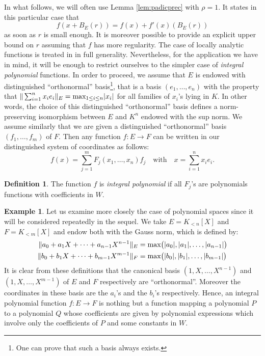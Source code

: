 \documentclass{jT}
\numberwithin{equation}{section}
\theoremstyle{definition}
\newtheorem{ex}[theo]{Example}
\newtheorem{deftn}[theo]{Definition}
\renewcommand{\max}{\text{\rm max}}
\newcommand{\A}{W}
\begin{document}
In what follows, we will often use Lemma \ref{lem:padicprec} with
$\rho = 1$. It states in this particular case that 
\begin{equation}
\label{eq:padicprec2}
f(x + B_E(r)) = f(x) + f'(x)(B_E(r))
\end{equation}
as soon as $r$ is small enough. It is moreover possible to provide
an explicit upper bound on $r$ assuming that $f$ has more regularity.
The case of locally analytic functions is treated in \cite{padicprec}
in full generality. Nevertheless, for the application we have in mind, 
it will be enough to restrict ourselves to the simpler case of 
\emph{integral polynomial} functions. In order to proceed, we assume 
that $E$ is endowed with distinguished ``orthonormal'' 
basis\footnote{One can prove that such a basis always exists.}, that is 
a basis $(e_1, \ldots, e_n)$ with the property that $\Vert \sum_{i=1}^n 
x_i e_i \Vert_E = \max_{1\leq i \leq n} |x_i|$ for all 
families of $x_i$'s lying in $K$. In other words, the choice of
this distinguished ``orthonormal'' basis defines a norm-preserving 
isomorphism between $E$ and $K^n$ endowed with the sup norm. We assume
similarly that we are given a distinguished ``orthonormal'' basis
$(f_1, \ldots, f_m)$ of $F$. Then any function $f : E \to F$ can
be written in our distinguished system of coordinates as follows:
$$f(x) = \sum_{j=1}^m F_j(x_1, \ldots, x_n) f_j
\quad \text{with} \quad x = \sum_{i=1}^n x_i e_i.$$

\begin{deftn}
The function $f$ is \emph{integral polynomial} if all $F_j$'s are
polynomials functions with coefficients in $\A$.
\end{deftn}

\begin{ex}
\label{ex:Gaussnorm}
Let us examine more closely the case of polynomial spaces since it will 
be considered repeatedly in the sequel. We take $E = K_{<n}[X]$ and $F = 
K_{<m}[X]$ and endow both with the Gauss norm, which is defined by:
\begin{align*}
\Vert a_0 + a_1 X + \cdots + a_{n-1} X^{n-1} \Vert_E & 
  = \max \big(|a_0|, |a_1|, \ldots, |a_{n-1}|\big) \\
\Vert b_0 + b_1 X + \cdots + b_{m-1} X^{m-1} \Vert_F & 
  = \max \big(|b_0|, |b_1|, \ldots, |b_{m-1}|\big)
\end{align*}
It is clear from these definitions that the canonical basis $(1, X, 
\ldots, X^{n-1})$ and $(1, X, \ldots, X^{m-1})$ of $E$ and $F$ 
respectively are ``orthonormal''. Moreover the coordinates in these
basis are the $a_i$'s and the $b_i$'s respectively. Hence, an integral
polynomial function $f : E \to F$ is nothing but a function mapping
a polynomial $P$ to a polynomial $Q$ whose coefficients are given by
polynomial expressions which involve only the coefficients of $P$ and 
some constants in $\A$.
\end{ex}
\end{document}
